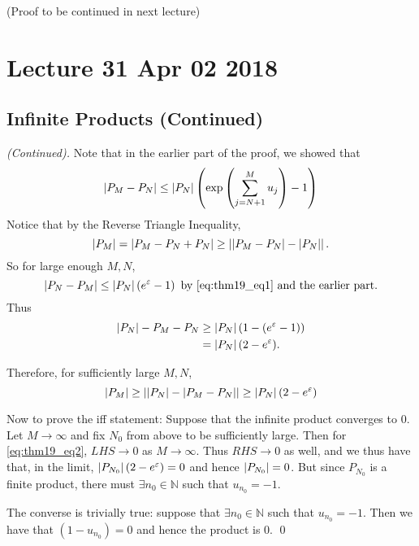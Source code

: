 \documentclass[notoc,notitlepage]{tufte-book}
\begin{document}
(Proof to be continued in next lecture)



\chapter{Lecture 31 Apr 02 2018}
  \label{chapter:lecture_31_apr_02_2018}

\section{Infinite Products (Continued)} %
\label{sec:infinite_products_continued}

\begin{proof}[(Continued)]
  Note that in the earlier part of the proof, we showed that
  \begin{equation}\label{eq:thm19_eq1}
    \left|P_M - P_N\right| \leq \left|P_N\right| \left( \exp{\left(\sum_{j= N + 1}^{M} u_j \right)} - 1 \right)
  \end{equation}
  Notice that by the Reverse Triangle Inequality,
  \begin{equation*}
    \left|P_M\right| = \left|P_M - P_N + P_N\right| \geq \left|\left|P_M - P_N\right| - \left|P_N\right|\right|.
  \end{equation*}
  So for large enough $M, N$,
  \begin{equation*}
    \abs{P_N - P_M} \leq \abs{P_N} (e^\epsilon - 1) \enspace \text{by } \cref{eq:thm19_eq1} \text{ and the earlier part.}
  \end{equation*}
  Thus
  \begin{align*}
    \left|P_N\right| - {P_M - P_N} &\geq \left|P_N\right|(1 - (e^\varepsilon - 1)) \\
      &= \left|P_N\right| (2 - e^\varepsilon).
  \end{align*}

  Therefore, for sufficiently large $M, N$,
  \begin{equation}\label{eq:thm19_eq2}
    \left|P_M\right| \geq \left|\left|P_N\right| - \left|P_M - P_N\right|\right| \geq \left|P_N\right| (2 - e^\varepsilon)
  \end{equation}

  Now to prove the iff statement: Suppose that the infinite product converges to $0$. Let $M \to \infty$ and fix $N_0$ from above to be sufficiently large. Then for \cref{eq:thm19_eq2}, $LHS \to 0$ as $M \to \infty$. Thus $RHS \to 0$ as well, and we thus have that, in the limit, $\left|P_{N_0}\right|(2 - e^\varepsilon) = 0$ and hence $\left|P_{N_0}\right| = 0$. But since $P_{N_0}$ is a finite product, there must $\exists n_0 \in \mathbb{N}$ such that $u_{n_0} = -1$.

  The converse is trivially true: suppose that $\exists n_0 \in \mathbb{N}$ such that $u_{n_0} = -1$. Then we have that $(1 - u_{n_0}) = 0$ and hence the product is $0$. \qed
\end{proof}
\end{document}
